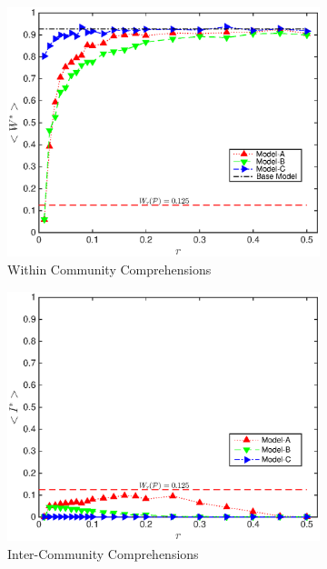 \documentclass[pre,twocolumn,showkeys,longbibliography]{revtex4-1}
\theoremstyle{plain}%
\theoremstyle{definition}
\theoremstyle{remark}
\begin{document}
\begin{figure}[!tbp]
	\begin{subfigure}{\columnwidth}%
		\includegraphics[width=\columnwidth]
			{FigWStar.eps}
		\caption{Within Community Comprehensions} 
		\label{fig:FigWStar}
	\end{subfigure}
	\begin{subfigure}{\columnwidth}%
		\includegraphics[width=\columnwidth]
			{FigIStar.eps}
		\caption{Inter-Community Comprehensions} 
		\label{fig:FigIStar}
	\end{subfigure}
	\begin{subfigure}{\columnwidth}%

\end{subfigure}
\end{figure}
\end{document}
